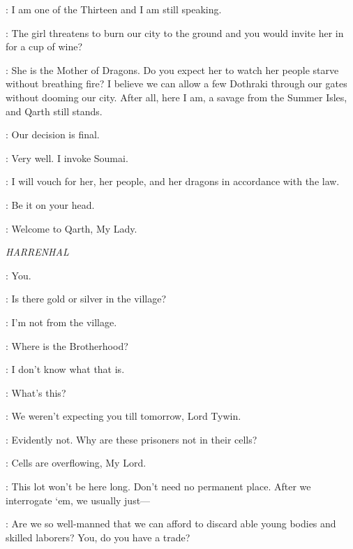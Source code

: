 \XARO: I am one of the Thirteen and I am still speaking. 

\SPICEKING: The girl threatens to burn our city to the ground and you would invite her in for a cup of wine? 

\XARO: She is the Mother of Dragons. Do you expect her to watch her people starve without breathing fire? I believe we can allow a few Dothraki through our gates without dooming our city. After all, here I am, a savage from the Summer Isles, and Qarth still stands. 

\SPICEKING: Our decision is final. 

\XARO: Very well. I invoke Soumai. 


\XARO: I will vouch for her, her people, and her dragons in accordance with the law. 

\SPICEKING: Be it on your head. 

\XARO: Welcome to Qarth, My Lady. 



\scene

\textit{HARRENHAL} 


\MOUNTAIN: You. 


\TICKLER: Is there gold or silver in the village? 

\GENDRY: I'm not from the village. 

\TICKLER: Where is the Brotherhood? 

\GENDRY: I don't know what that is. 


\TYWIN: What's this? 

\MOUNTAIN: We weren't expecting you till tomorrow, Lord Tywin. 

\TYWIN: Evidently not. Why are these prisoners not in their cells? 

\MOUNTAIN: Cells are overflowing, My Lord. 

\POLLIVER: This lot won't be here long. Don't need no permanent place. After we interrogate `em, we usually just--- 

\TYWIN: Are we so well-manned that we can afford to discard able young bodies and skilled laborers? You, do you have a trade? 

